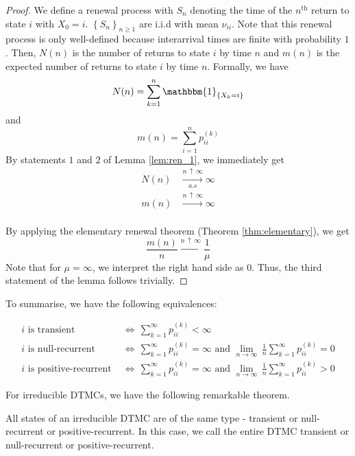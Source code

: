 \documentclass[12pt]{article}
\theoremstyle{definition}
\begin{document}
\begin{proof}
    We define a renewal process with $S_n$ denoting the time of the $n^{\text{th}}$ return to state $i$ with $X_0 = i$. $\left\{ S_n \right\}_{n \geq 1}$ are i.i.d with mean $\nu_{ii}$. Note that this renewal process is only well-defined because interarrival times are finite with probability $1$. Then, $N(n)$ is the number of returns to state $i$ by time $n$ and $m(n)$ is the expected number of returns to state $i$ by time $n$. Formally, we have
    \[
        N(n) = \sum_{k=1}^{n} \mathbbm{1}_{\left\{X_k = i \right\}}
    \]
    and
    \[
        m(n) = \sum_{i=1}^{n} p_{ii}^{(k)}
    \]
    By statements $1$ and $2$ of Lemma \ref{lem:ren_1}, we immediately get
    \begin{align*}
        N(n) &\xrightarrow[a.s]{n \, \uparrow \, \infty} \infty \\
        m(n) &\xrightarrow[]{n \, \uparrow \, \infty} \infty
    \end{align*}
    
    By applying the elementary renewal theorem (Theorem \ref{thm:elementary}), we get
    \[
        \frac{m(n)}{n} \xrightarrow[]{n \, \uparrow \, \infty} \frac{1}{\mu}
    \]
    Note that for $\mu = \infty$, we interpret the right hand side as $0$. Thus, the third statement of the lemma follows trivially. 
\end{proof}

\newpage

To summarise, we have the following equivalences:

\begin{align*}
    i \text{ is transient } &\iff \, \sum_{k=1}^{\infty} p_{ii}^{(k)} < \infty \\
    i \text{ is null-recurrent } &\iff \, \sum_{k=1}^{\infty} p_{ii}^{(k)} = \infty \text{  and } \lim_{n \to \infty} \, \frac{1}{n} \sum_{k=1}^{\infty} p_{ii}^{(k)} = 0 \\
    i \text{ is positive-recurrent } &\iff \, \sum_{k=1}^{\infty} p_{ii}^{(k)} = \infty \text{  and } \lim_{n \to \infty} \, \frac{1}{n} \sum_{k=1}^{\infty} p_{ii}^{(k)} > 0
\end{align*}

For irreducible DTMCs, we have the following remarkable theorem. 

\begin{thm} \label{thm:irreducible-states}
    All states of an irreducible DTMC are of the same type - transient or null-recurrent or positive-recurrent. In this case, we call the entire DTMC transient or null-recurrent or positive-recurrent.
\end{thm}
\end{document}

